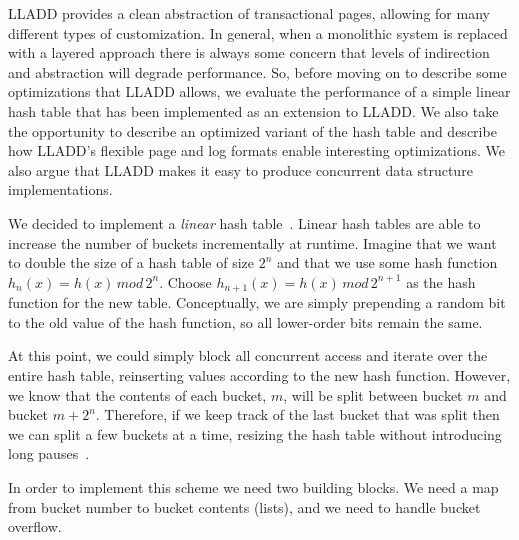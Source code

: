 \documentclass[10pt,letterpaper,twocolumn,english]{article}
\newcommand{\yad}{LLADD\xspace}
\begin{document}
\yad provides a clean abstraction of transactional pages, allowing for
many different types of customization.  In general, when a monolithic
system is replaced with a layered approach there is always some
concern that levels of indirection and abstraction will degrade
performance.  So, before moving on to describe some optimizations that
\yad allows, we evaluate the performance of a simple linear hash table
that has been implemented as an extension to \yad.  We also take the
opportunity to describe an optimized variant
of the hash table and describe how \yad's flexible page and log formats
enable interesting optimizations.  We also argue that \yad makes it
easy to produce concurrent data structure implementations.



We decided to implement a {\em linear} hash table~\cite{lht}.  Linear
hash tables are able to increase the number of buckets
incrementally at runtime. Imagine that we want
to double the size of a hash table of size $2^{n}$ and that we use 
some hash function $h_{n}(x)=h(x)\,
mod\,2^{n}$.  Choose $h_{n+1}(x)=h(x)\, mod\,2^{n+1}$ as the hash
function for the new table. Conceptually, we are simply prepending a
random bit to the old value of the hash function, so all lower-order
bits remain the same.

At this point, we could simply block all
concurrent access and iterate over the entire hash table, reinserting
values according to the new hash function.
However, 
we know that the contents of each bucket, $m$, will be split between
bucket $m$ and bucket $m+2^{n}$. Therefore, if we keep track of the
last bucket that was split then we can split a few buckets at a time,
resizing the hash table without introducing long pauses~\cite{lht}.

In order to implement this scheme we need two building blocks.  We
need a map from bucket number to bucket contents (lists), and we need to handle bucket overflow.
\end{document}
